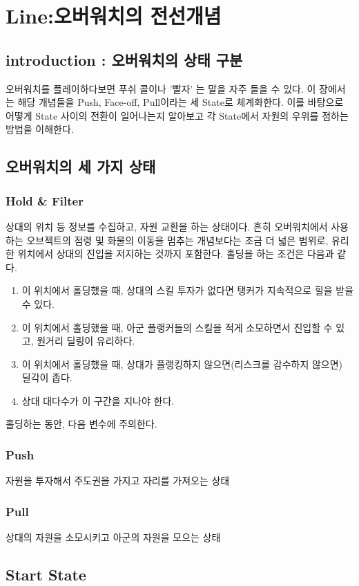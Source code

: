 \chapter{Line:오버워치의 전선개념}{\label{sec:state}}
\section{introduction : 오버워치의 상태 구분}
오버워치를 플레이하다보면 푸쉬 콜이나 '빨자' 는 말을 자주 들을 수 있다. 이 장에서는 해당 개념들을 Push, Face-off, Pull이라는 세 State로 체계화한다. 이를 바탕으로 어떻게 State 사이의 전환이 일어나는지 알아보고 각 State에서 자원의 우위를 점하는 방법을 이해한다.
\section{오버워치의 세 가지 상태}

\subsection{Hold \& Filter}
상대의 위치 등 정보를 수집하고, 자원 교환을 하는 상태이다. 흔히 오버워치에서 사용하는 오브젝트의 점령 및 화물의 이동을 멈추는 개념보다는 조금 더 넓은 범위로, 유리한 위치에서 상대의 진입을 저지하는 것까지 포함한다. 
홀딩을 하는 조건은 다음과 같다.
\begin{enumerate}
    \item 이 위치에서 홀딩했을 때, 상대의 스킬 투자가 없다면 탱커가 지속적으로 힐을 받을 수 있다.
    \item 이 위치에서 홀딩했을 때, 아군 플랭커들의 스킬을 적게 소모하면서 진입할 수 있고, 원거리 딜링이 유리하다.
    \item 이 위치에서 홀딩했을 때, 상대가 플랭킹하지 않으면(리스크를 감수하지 않으면) 딜각이 좁다.
    \item 상대 대다수가 이 구간을 지나야 한다.
\end{enumerate}
홀딩하는 동안, 다음 변수에 주의한다.
\subsection{Push}
자원을 투자해서 주도권을 가지고 자리를 가져오는 상태
\subsection{Pull}
상대의 자원을 소모시키고 아군의 자원을 모으는 상태
\section{Start State}
